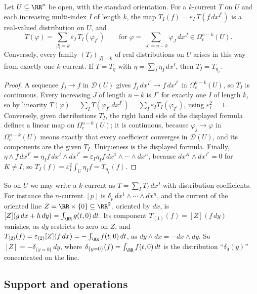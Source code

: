 \begin{proposition}\label{currents:proposition-currents-local}
Let $U \subseteq \RR^n$ be open, with the standard orientation. For a $k$-current $T$ on $U$ and each increasing multi-index $I$ of length $k$, the map
$T_I(f) = \varepsilon_I\,T(f\,dx^{I^c})$ is a real-valued distribution on $U$, and
\[
T(\varphi) = \sum_{|I| = k}\varepsilon_I\,T_I(\varphi_{I^c}) \qquad \text{for } \varphi = \sum_{|J| = n-k}\varphi_J\,dx^J \in \Omega^{n-k}_c(U).
\]
Conversely, every family $(T_I)_{|I| = k}$ of real distributions on $U$ arises in this way from exactly one $k$-current. If $T = T_\eta$ with $\eta = \sum_I\eta_I\,dx^I$, then $T_I = T_{\eta_I}$.
\end{proposition}

\begin{proof}
A sequence $f_j \to f$ in $\mathcal{D}(U)$ gives $f_j\,dx^{I^c} \to f\,dx^{I^c}$ in $\Omega^{n-k}_c(U)$, so $T_I$ is continuous. Every increasing $J$ of length $n - k$ is $I^c$ for exactly one $I$
of length $k$, so by linearity $T(\varphi) = \sum_IT(\varphi_{I^c}\,dx^{I^c}) = \sum_I\varepsilon_IT_I(\varphi_{I^c})$, using $\varepsilon_I^2 = 1$. Conversely, given distributions $T_I$, the right hand side
of the displayed formula defines a linear map on $\Omega^{n-k}_c(U)$; it is continuous, because $\varphi_j \to \varphi$ in $\Omega^{n-k}_c(U)$ means exactly that every coefficient converges in
$\mathcal{D}(U)$, and its components are the given $T_I$. Uniqueness is the displayed formula. Finally, $\eta \wedge f\,dx^{I^c} = \eta_If\,dx^I \wedge dx^{I^c} = \varepsilon_I\eta_If\,dx^1 \wedge \cdots \wedge dx^n$,
because $dx^K \wedge dx^{I^c} = 0$ for $K \neq I$; so $T_I(f) = \varepsilon_I^2\int_U\eta_If = T_{\eta_I}(f)$.
\end{proof}

So on $U$ we may write a $k$-current as $T = \sum_IT_I\,dx^I$ with distribution coefficients. For instance the $n$-current $[p]$ is $\delta_p\,dx^1 \wedge \cdots \wedge dx^n$, and the
current of the oriented line $Z = \RR \times \{0\} \subseteq \RR^2$, oriented by $dx$, is $[Z](g\,dx + h\,dy) = \int_\RR g(t, 0)\,dt$. Its component $T_{(1)}(f) = [Z](f\,dy)$ vanishes, as $dy$ restricts to zero on $Z$, and
$T_{(2)}(f) = \varepsilon_{(2)}[Z](f\,dx) = -\int_\RR f(t, 0)\,dt$, as $dy \wedge dx = -dx \wedge dy$. So $[Z] = -\delta_{\{y = 0\}}\,dy$, where $\delta_{\{y = 0\}}(f) = \int_\RR f(t, 0)\,dt$ is the
distribution ``$\delta_0(y)$'' concentrated on the line.

\subsection{Support and operations}\label{currents:subsection-currents-operations}

